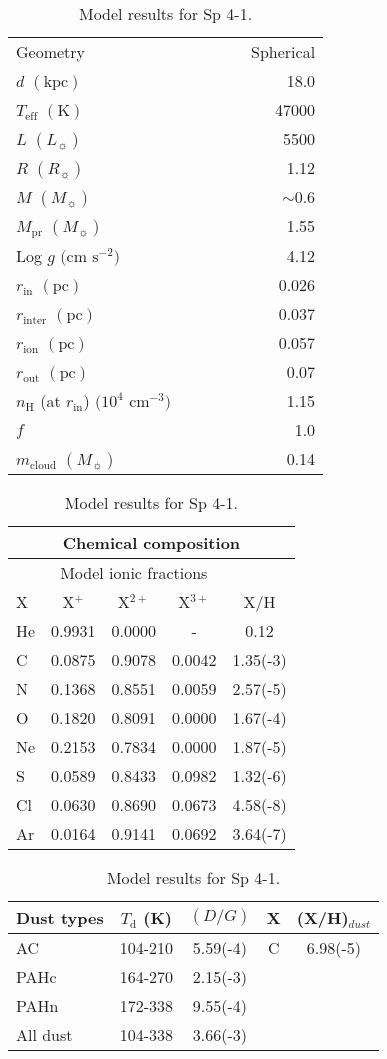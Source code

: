 \documentclass[a4paper,fleqn,usenatbib]{mnras}
\begin{document}
\begin{table}
\centering
\small
\caption{Model results for Sp 4-1. \label{tab:pimodelsp4-1}}
\begin{tabular}{l c c c c r}
\hline
Geometry &&&&& Spherical\\
$d$ $(\mathrm{kpc})$ &&&&& 18.0\\
$T_\mathrm{eff}$ $(\mathrm{K})$ &&&&& 47000\\
$L$ $(L_{\sun})$ &&&&& 5500\\
$R$ $(R_{\sun})$ &&&&& 1.12\\
$M$ $(M_{\sun})$ &&&&& $\sim$0.6\\
$M_\mathrm{pr}$ $(M_{\sun})$ &&&&& 1.55\\
Log $g$ $(\mathrm{cm}$ $\mathrm{s^{-2}})$ &&&&& 4.12\\
$r_\mathrm{in}$ $(\mathrm{pc})$ &&&&& 0.026\\
$r_\mathrm{inter}$ $(\mathrm{pc})$ &&&&& 0.037\\
$r_\mathrm{ion}$ $(\mathrm{pc})$ &&&&& 0.057\\
$r_\mathrm{out}$ $(\mathrm{pc})$ &&&&& 0.07\\
$n_\mathrm{H}$ (at $r_\mathrm{in}$) $(10^4$ $\mathrm{cm^{-3}})$ &&&&& 1.15 \\
$f$ &&&&& 1.0\\
$m_\mathrm{cloud}$ $(M_{\sun})$ &&&&& 0.14\\
\hline
\hline
\end{tabular}
\begin{tabular}{l c c c c}
\multicolumn{5}{c}{Chemical composition}\\
\hline
& \multicolumn{3}{c}{Model ionic fractions} &\\
X & X$^{+}$ & X$^{2+}$ & X$^{3+}$ & X/H \\
\hline
He	&	0.9931	&	0.0000	&	-	&	0.12	\\
C	&	0.0875	&	0.9078	&	0.0042		&	1.35(-3)	\\
N	&	0.1368	&	0.8551	&	0.0059		&	2.57(-5)\\
O	&	0.1820	&	0.8091	&	0.0000		&	1.67(-4)	\\
Ne	&	0.2153	&	0.7834	&	0.0000		&	1.87(-5)\\
S	&	0.0589	&	0.8433	&	0.0982		&	1.32(-6)	\\
Cl	&	0.0630	&	0.8690	&	0.0673		&	4.58(-8)\\
Ar	&	0.0164	&	0.9141	&	0.0692		&	3.64(-7)	\\
\end{tabular}
\begin{tabular}{l c c c c}
\hline
Dust types & $T_\mathrm{d}$ (K) & $(D/G)$ & X & (X/H)$_{dust}$\\
\hline
AC & 104-210 & 5.59(-4) & C & 6.98(-5)\\
PAHc & 164-270 & 2.15(-3) &  & \\
PAHn & 172-338 & 9.55(-4) &  & \\
All dust & 104-338 & 3.66(-3) & & \\
\hline
\end{tabular}
\end{table}
\end{document}
